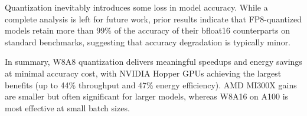 Quantization inevitably introduces some loss in model accuracy. While a complete analysis is left for future work, prior results \cite{kurtic2024give} indicate that FP8-quantized models retain more than 99\% of the accuracy of their bfloat16 counterparts on standard benchmarks, suggesting that accuracy degradation is typically minor.

In summary, W8A8 quantization delivers meaningful speedups and energy savings at minimal accuracy cost, with NVIDIA Hopper GPUs achieving the largest benefits (up to 44\% throughput and 47\% energy efficiency). AMD MI300X gains are smaller but often significant for larger models, whereas W8A16 on A100 is most effective at small batch sizes.